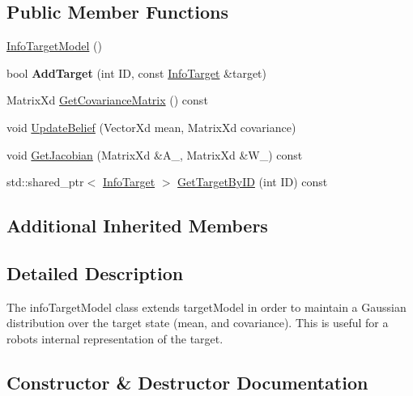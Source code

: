 \subsection*{Public Member Functions}
\begin{DoxyCompactItemize}
\item 
\hyperlink{classnx_1_1InfoTargetModel_a23f4a00fd334292a91af451f2278310d}{Info\+Target\+Model} ()
\item 
\mbox{\label{classnx_1_1InfoTargetModel_add9b3da880f99e8a0eb8a28921792bfa}} 
bool {\bfseries Add\+Target} (int ID, const \hyperlink{structnx_1_1InfoTarget}{Info\+Target} \&target)
\item 
Matrix\+Xd \hyperlink{classnx_1_1InfoTargetModel_a9387b0bd4e3e6d59570be7e7b369f792}{Get\+Covariance\+Matrix} () const
\item 
void \hyperlink{classnx_1_1InfoTargetModel_ab5c829223d48549889ef74d10bb8c408}{Update\+Belief} (Vector\+Xd mean, Matrix\+Xd covariance)
\item 
void \hyperlink{classnx_1_1InfoTargetModel_a371e2e95065f12fb672063eef87fa8c7}{Get\+Jacobian} (Matrix\+Xd \&A\+\_\+, Matrix\+Xd \&W\+\_\+) const
\item 
std\+::shared\+\_\+ptr$<$ \hyperlink{structnx_1_1InfoTarget}{Info\+Target} $>$ \hyperlink{classnx_1_1InfoTargetModel_add48b716a418b07c386cbe4726671540}{Get\+Target\+By\+ID} (int ID) const
\end{DoxyCompactItemize}
\subsection*{Additional Inherited Members}


\subsection{Detailed Description}
The info\+Target\+Model class extends target\+Model in order to maintain a Gaussian distribution over the target state (mean, and covariance). This is useful for a robot\textquotesingle{}s internal representation of the target. 

\subsection{Constructor \& Destructor Documentation}
\mbox{\label{classnx_1_1InfoTargetModel_a23f4a00fd334292a91af451f2278310d}} 
